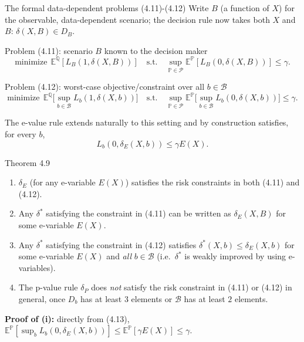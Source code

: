 \documentclass[aspectratio=169,10pt]{beamer}
\begin{document}
\begin{frame}[allowframebreaks]{The formal data-dependent problems (4.11)-(4.12)}
  Write $B$ (a function of $X$) for the observable, data-dependent scenario;
  the decision rule now takes both $X$ and $B$: $\delta(X,B)\in D_B$.

  \begin{block}{Problem (4.11): scenario $B$ known to the decision maker}
    \[
      \text{minimize}\ \ \mathbb E^{\mathbb Q}[L_B(1,\delta(X,B))]
      \quad\text{s.t.}\quad
      \sup_{\mathbb P\in\mathcal P}\mathbb E^{\mathbb P}[L_B(0,\delta(X,B))]\le\gamma.
    \]
  \end{block}

  \begin{block}{Problem (4.12): worst-case objective/constraint over all $b\in\mathcal B$}
    \[
      \text{minimize}\ \ \mathbb E^{\mathbb Q}\!\Big[\sup_{b\in\mathcal B}L_b(1,\delta(X,b))\Big]
      \quad\text{s.t.}\quad
      \sup_{\mathbb P\in\mathcal P}\mathbb E^{\mathbb P}\!\Big[\sup_{b\in\mathcal B}L_b(0,\delta(X,b))\Big]\le\gamma.
    \]
  \end{block}
  The e-value rule extends naturally to this setting and by construction
  satisfies, for every $b$,
  \[
    L_b(0,\delta_E(X,b)) \le \gamma E(X). \tag{4.13}
  \]

  \framebreak
  \begin{block}{Theorem 4.9}
    \begin{enumerate}
      \item $\delta_E$ (for any e-variable $E(X)$) satisfies the risk
      constraints in both (4.11) and (4.12).
      \item Any $\delta^*$ satisfying the constraint in (4.11) can be written
      as $\delta_E(X,B)$ for some e-variable $E(X)$.
      \item Any $\delta^*$ satisfying the constraint in (4.12) satisfies
      $\delta^*(X,b)\le\delta_E(X,b)$ for some e-variable $E(X)$ and
      \emph{all} $b\in\mathcal B$ (i.e.\ $\delta^*$ is weakly improved by
      using e-variables).
      \item The p-value rule $\delta_P$ does \emph{not} satisfy the risk
      constraint in (4.11) or (4.12) in general, once $D_b$ has at least $3$
      elements or $\mathcal B$ has at least $2$ elements.
    \end{enumerate}
  \end{block}
  \textbf{Proof of (i):} directly from (4.13), $\mathbb E^{\mathbb P}[\sup_b L_b(0,\delta_E(X,b))]\le\mathbb E^{\mathbb P}[\gamma E(X)]\le\gamma$.
\end{frame}
\end{document}
